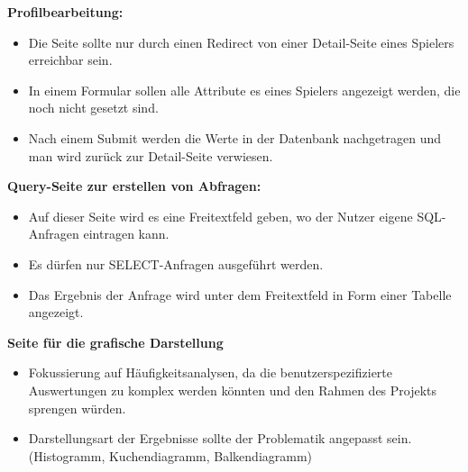 \noindent\textbf{Profilbearbeitung:}
\begin{itemize}
\item Die Seite sollte nur durch einen Redirect von einer Detail-Seite eines Spielers erreichbar sein.
\item In einem Formular sollen alle Attribute es eines Spielers angezeigt werden, die noch nicht gesetzt sind.
\item Nach einem Submit werden die Werte in der Datenbank nachgetragen und man wird zurück zur Detail-Seite verwiesen.
\end{itemize}

\noindent\textbf{Query-Seite zur erstellen von Abfragen:}
\begin{itemize}
\item Auf dieser Seite wird es eine Freitextfeld geben, wo der Nutzer eigene SQL-Anfragen eintragen kann.
\item Es dürfen nur SELECT-Anfragen ausgeführt werden.
\item Das Ergebnis der Anfrage wird unter dem Freitextfeld in Form einer Tabelle angezeigt.
\end{itemize}

\noindent\textbf{Seite für die grafische Darstellung}
\begin{itemize}
\item Fokussierung auf Häufigkeitsanalysen, da die benutzerspezifizierte Auswertungen zu komplex werden könnten und den Rahmen des Projekts sprengen würden.
\item Darstellungsart der Ergebnisse sollte der Problematik angepasst sein. (Histogramm, Kuchendiagramm, Balkendiagramm) 
\end{itemize}